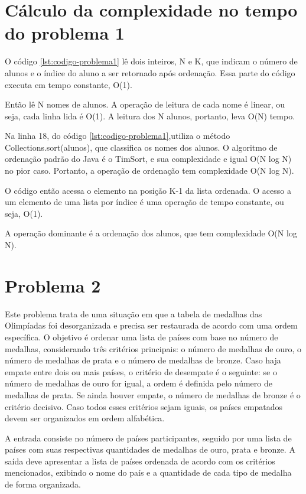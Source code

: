 \section{ Cálculo da complexidade no tempo do problema 1}

O código \ref{lst:codigo-problema1} lê dois inteiros, N e K, que indicam o número de alunos e o índice do aluno a ser retornado após ordenação. Essa parte do código executa em tempo constante, O(1).

Então lê N nomes de alunos. A operação de leitura de cada nome é linear, ou seja, cada linha lida é O(1). A leitura dos N alunos, portanto, leva O(N) tempo.
   
Na linha 18, do código \ref{lst:codigo-problema1},utiliza o método Collections.sort(alunos), que classifica os nomes dos alunos. O algoritmo de ordenação padrão do Java é o TimSort, e sua complexidade e igual  O(N log N) no pior caso.
Portanto, a operação de ordenação tem complexidade O(N log N).

O código então acessa o elemento na posição K-1 da lista ordenada. O acesso a um elemento de uma lista por índice é uma operação de tempo constante, ou seja, O(1).

A operação dominante é a ordenação dos alunos, que tem complexidade O(N log N).

\section{Problema 2}

Este problema trata de uma situação em que a tabela de medalhas das Olimpíadas foi desorganizada e precisa ser restaurada de acordo com uma ordem específica. O objetivo é ordenar uma lista de países com base no número de medalhas, considerando três critérios principais: o número de medalhas de ouro, o número de medalhas de prata e o número de medalhas de bronze. Caso haja empate entre dois ou mais países, o critério de desempate é o seguinte: se o número de medalhas de ouro for igual, a ordem é definida pelo número de medalhas de prata. Se ainda houver empate, o número de medalhas de bronze é o critério decisivo. Caso todos esses critérios sejam iguais, os países empatados devem ser organizados em ordem alfabética.

A entrada consiste no número de países participantes, seguido por uma lista de países com suas respectivas quantidades de medalhas de ouro, prata e bronze. A saída deve apresentar a lista de países ordenada de acordo com os critérios mencionados, exibindo o nome do país e a quantidade de cada tipo de medalha de forma organizada.

